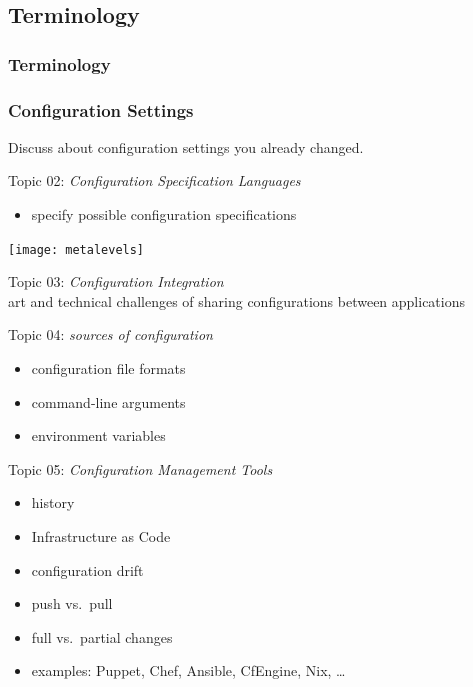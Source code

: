 \subsection{Terminology}
\begin{frame}
	\frametitle{Terminology}
	
\end{frame}

\begin{assignment}
	\frametitle{Configuration Settings}
	\begin{task}
	Discuss about configuration settings you already changed.
	\end{task}
\end{assignment}

\begin{frame}
	Topic 02: \textit{Configuration Specification Languages}
	\begin{itemize}
		\item specify possible configuration specifications
	\end{itemize}
	\vspace{0.5cm}
	\texttt{[image: metalevels]}
\end{frame}

\begin{frame}
	Topic 03: \textit{Configuration Integration}
	\\ \vspace{1cm}
	art and technical challenges of sharing configurations between applications
\end{frame}


\begin{frame}
	Topic 04: \textit{sources of configuration}
	\begin{itemize}
		\item configuration file formats
		\item command-line arguments
		\item environment variables
	\end{itemize}
\end{frame}

\begin{frame}
	Topic 05: \textit{Configuration Management Tools}
	\begin{itemize}
		\item history
		\item Infrastructure as Code
		\item configuration drift
		\item push vs.\ pull
		\item full vs.\ partial changes
		\item examples: Puppet, Chef, Ansible, CfEngine, Nix, \dots
	\end{itemize}
\end{frame}


